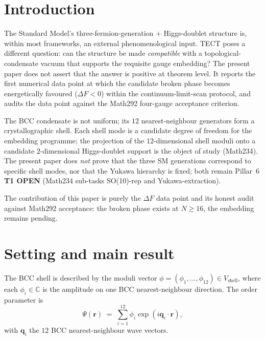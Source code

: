 \section{Introduction}\label{sec:intro}
The Standard Model's three-fermion-generation $+$ Higgs-doublet
structure is, within most frameworks, an external phenomenological
input. TECT poses a different question: can the structure be made
\emph{compatible} with a topological-condensate vacuum that supports
the requisite gauge embedding? The present paper does not assert that
the answer is positive at theorem level. It reports the first
numerical data point at which the candidate broken phase becomes
energetically favoured ($\Delta F<0$) within the continuum-limit-scan
protocol, and audits the data point against the Math292 four-gauge
acceptance criterion.

The BCC condensate is not uniform; its $12$ nearest-neighbour
generators form a crystallographic shell. Each shell mode is a
candidate degree of freedom for the embedding programme; the
projection of the $12$-dimensional shell moduli onto a candidate
$2$-dimensional Higgs-doublet support is the object of study (Math234).
The present paper does \emph{not} prove that the three SM generations
correspond to specific shell modes, nor that the Yukawa hierarchy is
fixed; both remain Pillar~6 \textbf{T1 OPEN} (Math234 sub-tasks
SO(10)-rep and Yukawa-extraction).

The contribution of this paper is purely the $\Delta F$ data point and
its honest audit against Math292 acceptance: the broken phase exists
at $N\geq 16$, the embedding remains pending.

\section{Setting and main result}\label{sec:setup}
The BCC shell is described by the moduli vector
$\phi = (\phi_1,\dots,\phi_{12})\in V_{\mathrm{shell}}$, where each
$\phi_i\in\mathbb{C}$ is the amplitude on one BCC nearest-neighbour
direction. The order parameter is
\begin{equation}\label{eq:OP}
  \Psi(\mathbf{r}) \;=\; \sum_{i=1}^{12} \phi_i \exp(i\mathbf{q}_i\cdot\mathbf{r}),
\end{equation}
with $\mathbf{q}_i$ the $12$ BCC nearest-neighbour wave vectors.

